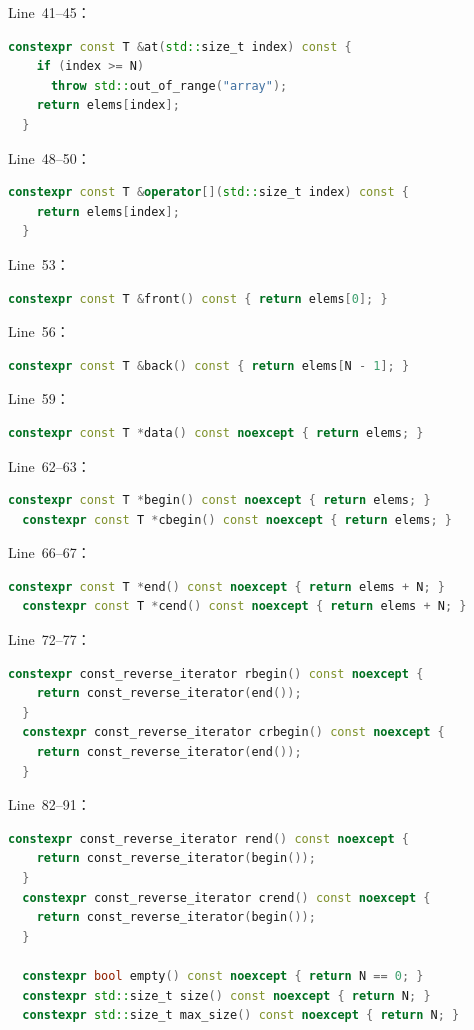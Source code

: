 \documentclass[a4paper,12pt]{article}
\begin{document}
Line~41--45：
\begin{lstlisting}[language=C++]
  constexpr const T &at(std::size_t index) const {
    if (index >= N)
      throw std::out_of_range("array");
    return elems[index];
  }
\end{lstlisting}
Line~48--50：
\begin{lstlisting}[language=C++]
  constexpr const T &operator[](std::size_t index) const {
    return elems[index];
  }
\end{lstlisting}
Line~53：
\begin{lstlisting}[language=C++]
  constexpr const T &front() const { return elems[0]; }
\end{lstlisting}
Line~56：
\begin{lstlisting}[language=C++]
  constexpr const T &back() const { return elems[N - 1]; }
\end{lstlisting}
Line~59：
\begin{lstlisting}[language=C++]
  constexpr const T *data() const noexcept { return elems; }
\end{lstlisting}
Line~62--63：
\begin{lstlisting}[language=C++]
  constexpr const T *begin() const noexcept { return elems; }
  constexpr const T *cbegin() const noexcept { return elems; }
\end{lstlisting}
Line~66--67：
\begin{lstlisting}[language=C++]
  constexpr const T *end() const noexcept { return elems + N; }
  constexpr const T *cend() const noexcept { return elems + N; }
\end{lstlisting}
Line~72--77：
\begin{lstlisting}[language=C++]
  constexpr const_reverse_iterator rbegin() const noexcept {
    return const_reverse_iterator(end());
  }
  constexpr const_reverse_iterator crbegin() const noexcept {
    return const_reverse_iterator(end());
  }
\end{lstlisting}
Line~82--91：
\begin{lstlisting}[language=C++]
  constexpr const_reverse_iterator rend() const noexcept {
    return const_reverse_iterator(begin());
  }
  constexpr const_reverse_iterator crend() const noexcept {
    return const_reverse_iterator(begin());
  }

  constexpr bool empty() const noexcept { return N == 0; }
  constexpr std::size_t size() const noexcept { return N; }
  constexpr std::size_t max_size() const noexcept { return N; }
\end{lstlisting}
\end{document}
